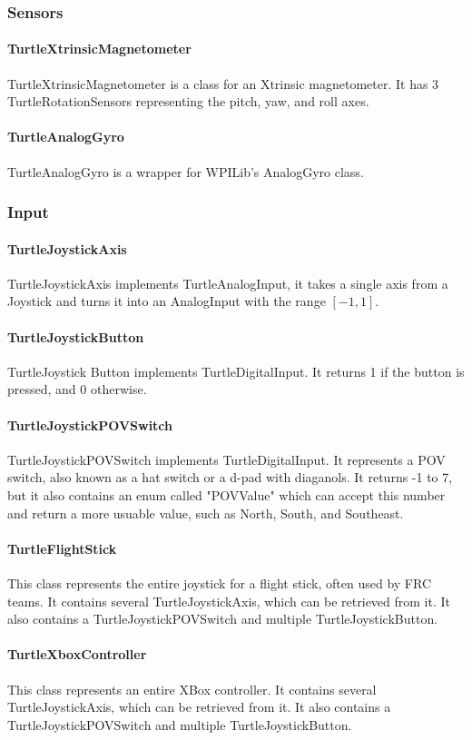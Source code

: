 \documentclass[]{report}
\begin{document}
\subsubsection{Sensors}
\paragraph{TurtleXtrinsicMagnetometer}
TurtleXtrinsicMagnetometer is a class for an Xtrinsic magnetometer.
It has 3 TurtleRotationSensors representing the pitch, yaw, and roll axes.
\paragraph{TurtleAnalogGyro}
TurtleAnalogGyro is a wrapper for WPILib's AnalogGyro class.

\subsubsection{Input}
\paragraph{TurtleJoystickAxis}
TurtleJoystickAxis implements TurtleAnalogInput, it takes a single axis from a Joystick and turns it into an AnalogInput with the range $[-1,1]$.
\paragraph{TurtleJoystickButton}
TurtleJoystick Button implements TurtleDigitalInput.
It returns 1 if the button is pressed, and 0 otherwise.
\paragraph{TurtleJoystickPOVSwitch}
TurtleJoystickPOVSwitch implements TurtleDigitalInput.
It represents a POV switch, also known as a hat switch or a d-pad with diaganols.
It returns -1 to 7, but it also contains an enum called "POVValue" which can accept this number and return a more usuable value, such as North, South, and Southeast.
\paragraph{TurtleFlightStick}
This class represents the entire joystick for a flight stick, often used by FRC teams.
It contains several TurtleJoystickAxis, which can be retrieved from it.
It also contains a TurtleJoystickPOVSwitch and multiple TurtleJoystickButton.
\paragraph{TurtleXboxController}
This class represents an entire XBox controller.
It contains several TurtleJoystickAxis, which can be retrieved from it.
It also contains a TurtleJoystickPOVSwitch and multiple TurtleJoystickButton.
\end{document}
